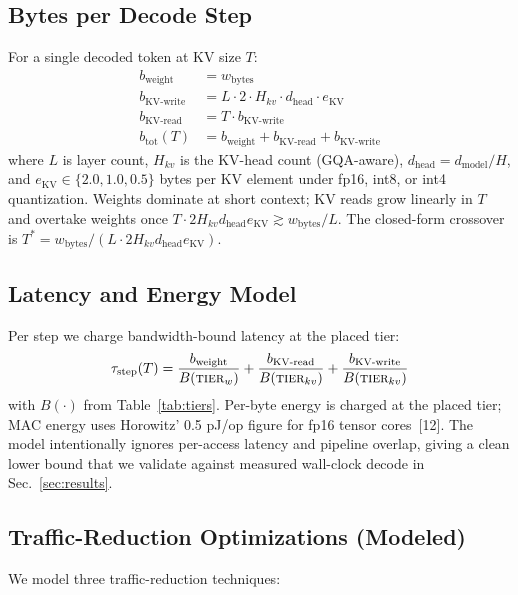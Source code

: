 \documentclass[conference]{IEEEtran}
\begin{document}
\subsection{Bytes per Decode Step}

For a single decoded token at KV size $T$:
\begin{align}
b_{\text{weight}}    &= w_{\text{bytes}}  \\
b_{\text{KV-write}}  &= L \cdot 2 \cdot H_{kv} \cdot d_{\text{head}} \cdot e_{\text{KV}} \\
b_{\text{KV-read}}   &= T \cdot b_{\text{KV-write}}  \\
b_{\text{tot}}(T)    &= b_{\text{weight}} + b_{\text{KV-read}} + b_{\text{KV-write}}
\end{align}
where $L$ is layer count, $H_{kv}$ is the KV-head count (GQA-aware), $d_{\text{head}} = d_{\text{model}}/H$, and $e_{\text{KV}} \in \{2.0, 1.0, 0.5\}$ bytes per KV element under fp16, int8, or int4 quantization. Weights dominate at short context; KV reads grow linearly in $T$ and overtake weights once $T \cdot 2 H_{kv} d_{\text{head}} e_{\text{KV}} \gtrsim w_{\text{bytes}} / L$. The closed-form crossover is $T^{*} = w_{\text{bytes}} / (L \cdot 2 H_{kv} d_{\text{head}} e_{\text{KV}})$.

\subsection{Latency and Energy Model}

Per step we charge bandwidth-bound latency at the placed tier:
\begin{equation}
\tau_{\text{step}}(T) = \frac{b_{\text{weight}}}{B(\textsc{tier}_{w})}
                      + \frac{b_{\text{KV-read}}}{B(\textsc{tier}_{kv})}
                      + \frac{b_{\text{KV-write}}}{B(\textsc{tier}_{kv})}
\end{equation}
with $B(\cdot)$ from Table~\ref{tab:tiers}. Per-byte energy is charged at the placed tier; MAC energy uses Horowitz' 0.5 pJ/op figure for fp16 tensor cores~[12]. The model intentionally ignores per-access latency and pipeline overlap, giving a clean lower bound that we validate against measured wall-clock decode in Sec.~\ref{sec:results}.

\subsection{Traffic-Reduction Optimizations (Modeled)}

We model three traffic-reduction techniques:
\end{document}
